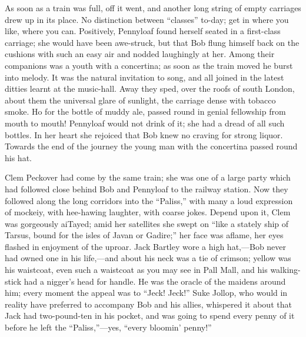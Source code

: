 As soon as a train was full, off it went, and another long string of
empty carriages drew up in its place. No distinction between ``classes''
to-day; get in where you like, where you can. Positively, Pennyloaf
found herself seated in a first-class carriage; she would have been
awe-struck, but that Bob flung himself back on the cushions with such an
easy air and nodded laughingly at her. Among their companions was a
youth with a concertina; as soon as the train moved he burst into
melody. It was the natural invitation to song, and all joined in the
latest {\protect\hypertarget{257}{}{}}ditties learnt at the music-hall.
Away they sped, over the roofs of south London, about them the universal
glare of sunlight, the carriage dense with tobacco smoke. Ho for the
bottle of muddy ale, passed round in genial fellowship from mouth to
mouth! Pennyloaf would not drink of it; she had a dread of all such
bottles. In her heart she rejoiced that Bob knew no craving for strong
liquor. Towards the end of the journey the young man with the concertina
passed round his hat.

Clem Peckover had come by the same train; she was one of a large party
which had followed close behind Bob and Pennyloaf to the railway
station. Now they followed along the long corridors into the ``Paliss,''
with many a loud expression of mockeiy, with hee-hawing laughter, with
coarse jokes. Depend upon it, Clem was gorgeously aiTayed; amid her
satellites she swept on ``like a stately ship of Tarsus, bound for the
isles of Javan or Gadire;'' her face was aflame, her eyes flashed in
enjoyment of the {\protect\hypertarget{258}{}{}}uproar. Jack Bartley
wore a high hat,---Bob never had owned one in his life,---and about his
neck was a tie of crimson; yellow was his waistcoat, even such a
waistcoat as you may see in Pall Mall, and his walking-stick had a
nigger's head for handle. He was the oracle of the maidens around him;
every moment the appeal was to ``Jeck! Jeck!'' Suke Jollop, who would in
reality have preferred to accompany Bob and his allies, whispered it
about that Jack had two-pound-ten in his pocket, and was going to spend
every penny of it before he left the ``Paliss,''---yes, ``every bloomin'
penny!''

